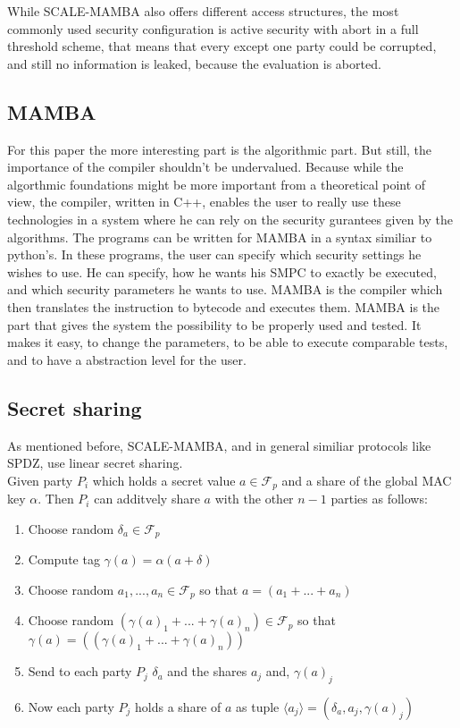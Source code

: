 \documentclass[english,runningheads,a4paper]{llncs}[2018/03/10]
\begin{document}
While SCALE-MAMBA also offers different access structures, the most commonly used security configuration is active security with abort in a full threshold scheme, that means that every except one party could be corrupted, and still no information is leaked, because the evaluation is aborted.

\subsection{MAMBA}
For this paper the more interesting part is the algorithmic part. But still, the importance of the compiler shouldn't be undervalued. Because while the algorthmic foundations might be more important from a theoretical point of view, the compiler, written in C++, enables the user to really use these technologies in a system where he can rely on the security gurantees given by the algorithms. The programs can be written for MAMBA in a syntax similiar to python's. In these programs, the user can specify which security settings he wishes to use. He can specify, how he wants his SMPC to exactly be executed, and which security parameters he wants to use. MAMBA is the compiler which then translates the instruction to bytecode and executes them. MAMBA is the part that gives the system the possibility to be properly used and tested. It makes it easy, to change the parameters, to be able to execute comparable tests, and to have a abstraction level for the user.\\




\subsection{Secret sharing}

As mentioned before, SCALE-MAMBA, and in general similiar protocols like SPDZ, use linear secret sharing.\\
Given party \(P_i\) which holds a secret value \( a \in \mathcal{F}_p\) and a share of the global MAC key \( \alpha\). Then \( P_i\) can additvely share \( a\) with the other \(n-1\) parties as follows:
\begin{enumerate}
\item Choose random \(\delta_a \in \mathcal{F}_p\)
\item Compute tag $ \gamma (a)= \alpha(a+\delta)$
\item Choose random \(a_1,...,a_n \in \mathcal{F}_p\) so that $ a=(a_1+...+a_n)$
\item Choose random \((\gamma (a)_1+...+\gamma (a)_n) \in \mathcal{F}_p\) so that $\gamma (a)=((\gamma (a)_1+...+\gamma (a)_n))$
\item Send to each party \( P_j \) \( \delta_a \) and the shares \(a_j \) and, \( \gamma (a)_j \)
\item Now each party \( P_j\) holds a share of \( a\) as tuple \(\langle a_j\rangle = (\delta_a,a_j,\gamma(a)_j )\)
\end{enumerate}
\end{document}
